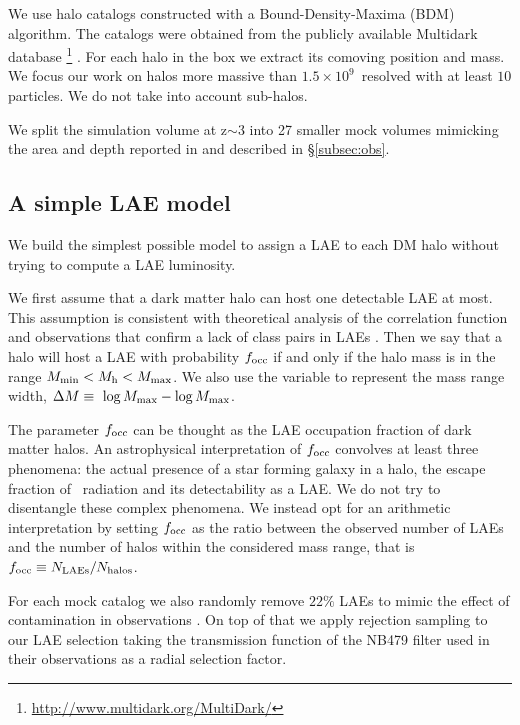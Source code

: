 \documentclass{emulateapj}
\newcommand{\ly}{{\ifmmode{{\rm Ly}\alpha}\else{Ly$\alpha$}\fi}}
\newcommand{\hMsun}{{\ifmmode{h^{-1}{\rm {M_{\odot}}}}\else{$h^{-1}{\rm{M_{\odot}}}$}\fi}}
\newcommand{\mmin}{{\ifmmode{{M_{\rm min}}}\else{${M_{\rm min}}$}\fi}}
\newcommand{\mmax}{{\ifmmode{{M_{\rm max}}}\else{${M_{\rm max}}$}\fi}}
\newcommand{\dm}{{\ifmmode{{\Delta M}}\else{$\Delta M$}\fi}}
\newcommand{\focc}{{\ifmmode{{f_{\rm occ}}}\else{${f_{\rm occ}}$}\fi}}
\begin{document}
We use halo catalogs constructed with a Bound-Density-Maxima (BDM)
algorithm. 
The catalogs were obtained from the publicly available Multidark
database  \footnote{\url{http://www.multidark.org/MultiDark/}}
\citep{MultiDark}. 
For each  halo in the box we extract its comoving position and mass.  
We focus our work on halos more massive than $1.5\times
10^{9}$\hMsun\ resolved with at least  $10$ particles. 
We do not take into account sub-halos.


We split the simulation volume at z$\sim$3 into  27 smaller mock
volumes mimicking the  area and depth reported in \citet{Bielby16} and
described in \S \ref{subsec:obs}.   


\subsection{A simple LAE model}
\label{subsec:mocks}

We build the simplest possible model to assign a LAE to each DM halo
without trying to compute a LAE luminosity.
  
We first assume that a dark matter halo can host one detectable LAE at
most.   
This assumption is consistent with theoretical analysis of the
correlation function \citep{Jose2013b} and observations that confirm a
lack of class pairs in LAEs \cite{Bond2009}.  
Then we say that a halo will host a LAE with probability $\focc$
if and only if the halo mass is in the range $\mmin < M_{\mathrm
  h} < \mmax$. 
We also use the variable \dm to represent the mass range width,
$\dm\equiv\ \log \mmax - \log \mmax$.  


The parameter $\focc$ can be thought as the LAE occupation fraction of
dark matter halos.
An astrophysical interpretation of $f_{\rm occ}$ convolves at least
three phenomena: the actual presence of a star forming galaxy in a
halo, the escape fraction of \ly\ radiation and its detectability as
a LAE.   
We do not try to disentangle these complex phenomena.
We instead opt for an arithmetic interpretation by setting $\focc$ as
the ratio between the observed number of LAEs and the number of halos
within the considered mass range, that is $\focc \equiv N_{\rm
  LAEs}/N_{\mathrm{halos}}$.   

For each mock catalog we also randomly remove $22\%$ LAEs to mimic the
effect of contamination in observations \citet{Bielby16}.
On top of that we apply rejection sampling  to our LAE selection
taking the transmission function of the NB479 filter used in their
observations as a radial selection factor. 
\end{document}
